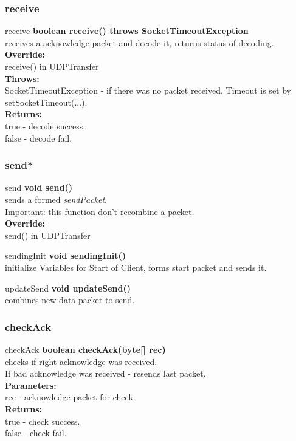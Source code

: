 \documentclass[12pt]{article}
\begin{document}
\subsubsection{receive}
\begin{mybox}[colback=white]{receive}
\textbf{boolean receive() throws SocketTimeoutException} \\
receives a acknowledge packet and decode it, returns status of decoding.
\\
\textbf{Override:} \\
receive() in UDPTransfer \\
\textbf{Throws:} \\
SocketTimeoutException - if there was no packet received. Timeout is
set by setSocketTimeout(...). \\
\textbf{Returns:} \\
true - decode success. \\
false - decode fail.
\end{mybox}

\subsubsection{send*}
\begin{mybox}[colback=white]{send}
\textbf{void send()} \\
sends a formed \textit{sendPacket}. \\
Important: this function don't recombine a packet.\\
\textbf{Override:} \\
send() in UDPTransfer \\
\end{mybox}

\begin{mybox}[colback=white]{sendingInit}
\textbf{void sendingInit()} \\
initialize Variables for Start of Client, forms start packet and sends it.
\end{mybox}

\begin{mybox}[colback=white]{updateSend}
\textbf{void updateSend()} \\
combines new data packet to send.
\end{mybox}

\subsubsection{checkAck}
\begin{mybox}[colback=white]{checkAck}
\textbf{boolean checkAck(byte[] rec)} \\
checks if right acknowledge was received. \\
If bad acknowledge was received - resends last packet.
\\
\textbf{Parameters:} \\
rec - acknowledge packet for check. \\
\textbf{Returns:} \\
true - check success. \\
false - check fail.
\end{mybox}
\end{document}
